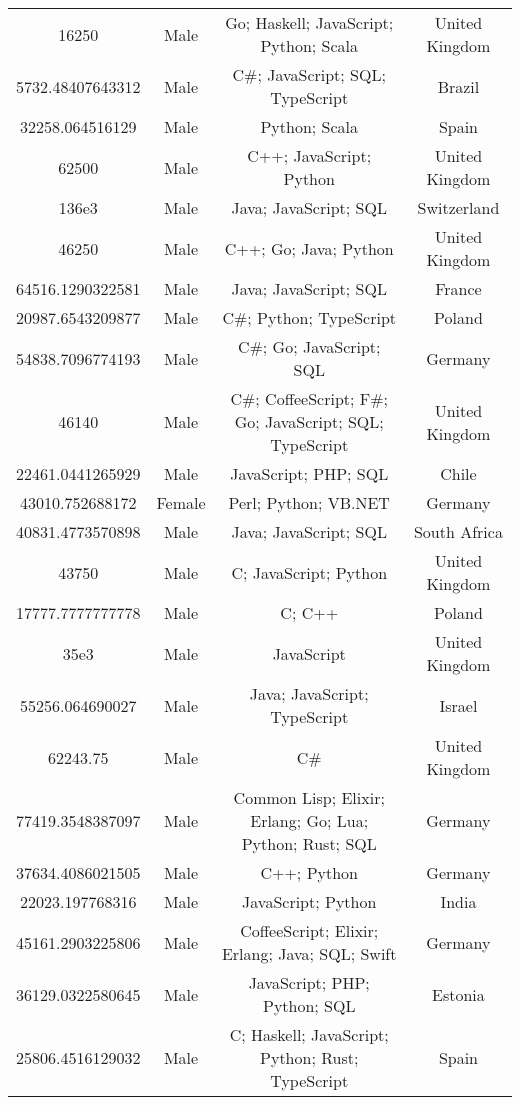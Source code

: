 \begin{center}
\begin{tabular}{ |c|c|c|c| }
16250  &  Male  &  Go; Haskell; JavaScript; Python; Scala  &  United Kingdom  \\ 
5732.48407643312  &  Male  &  C\#; JavaScript; SQL; TypeScript  &  Brazil  \\ 
32258.064516129  &  Male  &  Python; Scala  &  Spain  \\ 
62500  &  Male  &  C++; JavaScript; Python  &  United Kingdom  \\ 
136e3  &  Male  &  Java; JavaScript; SQL  &  Switzerland  \\ 
46250  &  Male  &  C++; Go; Java; Python  &  United Kingdom  \\ 
64516.1290322581  &  Male  &  Java; JavaScript; SQL  &  France  \\ 
20987.6543209877  &  Male  &  C\#; Python; TypeScript  &  Poland  \\ 
54838.7096774193  &  Male  &  C\#; Go; JavaScript; SQL  &  Germany  \\ 
46140  &  Male  &  C\#; CoffeeScript; F\#; Go; JavaScript; SQL; TypeScript  &  United Kingdom  \\ 
22461.0441265929  &  Male  &  JavaScript; PHP; SQL  &  Chile  \\ 
43010.752688172  &  Female  &  Perl; Python; VB.NET  &  Germany  \\ 
40831.4773570898  &  Male  &  Java; JavaScript; SQL  &  South Africa  \\ 
43750  &  Male  &  C; JavaScript; Python  &  United Kingdom  \\ 
17777.7777777778  &  Male  &  C; C++  &  Poland  \\ 
35e3  &  Male  &  JavaScript  &  United Kingdom  \\ 
55256.064690027  &  Male  &  Java; JavaScript; TypeScript  &  Israel  \\ 
62243.75  &  Male  &  C\#  &  United Kingdom  \\ 
77419.3548387097  &  Male  &  Common Lisp; Elixir; Erlang; Go; Lua; Python; Rust; SQL  &  Germany  \\ 
37634.4086021505  &  Male  &  C++; Python  &  Germany  \\ 
22023.197768316  &  Male  &  JavaScript; Python  &  India  \\ 
45161.2903225806  &  Male  &  CoffeeScript; Elixir; Erlang; Java; SQL; Swift  &  Germany  \\ 
36129.0322580645  &  Male  &  JavaScript; PHP; Python; SQL  &  Estonia  \\ 
25806.4516129032  &  Male  &  C; Haskell; JavaScript; Python; Rust; TypeScript  &  Spain  \\ 

\end{tabular}
\end{center}
